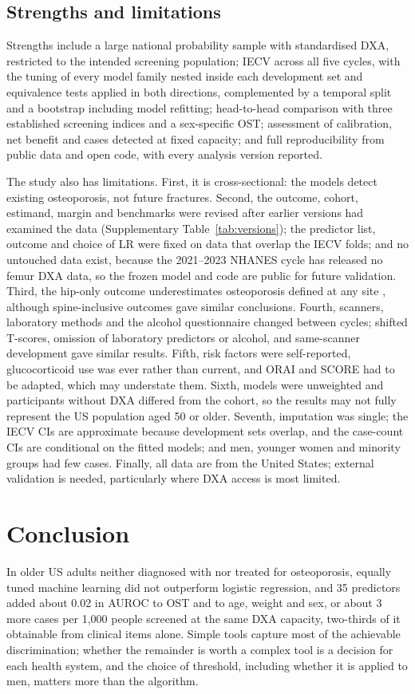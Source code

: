 \documentclass[11pt,a4paper]{article}
\begin{document}
\subsection{Strengths and limitations}
Strengths include a large national probability sample with standardised DXA, restricted to the intended screening population; IECV across all five cycles, with the tuning of every model family nested inside each development set and equivalence tests applied in both directions, complemented by a temporal split and a bootstrap including model refitting; head-to-head comparison with three established screening indices and a sex-specific OST; assessment of calibration, net benefit and cases detected at fixed capacity; and full reproducibility from public data and open code, with every analysis version reported.

The study also has limitations. First, it is cross-sectional: the models detect existing osteoporosis, not future fractures. Second, the outcome, cohort, estimand, margin and benchmarks were revised after earlier versions had examined the data (Supplementary Table~\ref{tab:versions}); the predictor list, outcome and choice of LR were fixed on data that overlap the IECV folds; and no untouched data exist, because the 2021--2023 NHANES cycle has released no femur DXA data, so the frozen model and code are public for future validation. Third, the hip-only outcome underestimates osteoporosis defined at any site \cite{sarafrazi2021}, although spine-inclusive outcomes gave similar conclusions. Fourth, scanners, laboratory methods and the alcohol questionnaire changed between cycles; shifted T-scores, omission of laboratory predictors or alcohol, and same-scanner development gave similar results. Fifth, risk factors were self-reported, glucocorticoid use was ever rather than current, and ORAI and SCORE had to be adapted, which may understate them. Sixth, models were unweighted and participants without DXA differed from the cohort, so the results may not fully represent the US population aged 50 or older. Seventh, imputation was single; the IECV CIs are approximate because development sets overlap, and the case-count CIs are conditional on the fitted models; and men, younger women and minority groups had few cases. Finally, all data are from the United States; external validation is needed, particularly where DXA access is most limited.

\section{Conclusion}
In older US adults neither diagnosed with nor treated for osteoporosis, equally tuned machine learning did not outperform logistic regression, and 35 predictors added about 0.02 in AUROC to OST and to age, weight and sex, or about 3 more cases per 1,000 people screened at the same DXA capacity, two-thirds of it obtainable from clinical items alone. Simple tools capture most of the achievable discrimination; whether the remainder is worth a complex tool is a decision for each health system, and the choice of threshold, including whether it is applied to men, matters more than the algorithm.
\end{document}
